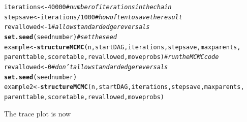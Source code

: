 \documentclass[a4paper]{article}\usepackage[]{graphicx}\usepackage[]{color}
\makeatletter
\newcommand{\hlnum}[1]{\textcolor[rgb]{0.686,0.059,0.569}{#1}}%
\newcommand{\hlcom}[1]{\textcolor[rgb]{0.678,0.584,0.686}{\textit{#1}}}%
\newcommand{\hlopt}[1]{\textcolor[rgb]{0,0,0}{#1}}%
\newcommand{\hlstd}[1]{\textcolor[rgb]{0.345,0.345,0.345}{#1}}%
\newcommand{\hlkwb}[1]{\textcolor[rgb]{0.69,0.353,0.396}{#1}}%
\newcommand{\hlkwd}[1]{\textcolor[rgb]{0.737,0.353,0.396}{\textbf{#1}}}%
\newenvironment{kframe}{%
 \def\at@end@of@kframe{}%
 \ifinner\ifhmode%
  \def\at@end@of@kframe{\end{minipage}}%
  \begin{minipage}{\columnwidth}%
 \fi\fi%
 \def\FrameCommand##1{\hskip\@totalleftmargin \hskip-\fboxsep
 \colorbox{shadecolor}{##1}\hskip-\fboxsep
     \hskip-\linewidth \hskip-\@totalleftmargin \hskip\columnwidth}%
 \MakeFramed {\advance\hsize-\width
   \@totalleftmargin\z@ \linewidth\hsize
   \@setminipage}}%
 {\par\unskip\endMakeFramed%
 \at@end@of@kframe}
\newenvironment{knitrout}{}{} %
\newcommand{\nn}{\noindent}
\makeatother
\begin{document}
\begin{knitrout}
\color{fgcolor}\begin{kframe}
\begin{alltt}
\hlstd{iterations} \hlkwb{<-} \hlnum{40000}  \hlcom{#number of iterations in the chain}
\hlstd{stepsave} \hlkwb{<-} \hlstd{iterations}\hlopt{/}\hlnum{1000}  \hlcom{#how often to save the result}
\hlstd{revallowed} \hlkwb{<-} \hlnum{1}  \hlcom{# allow standard edge reversals}
\hlkwd{set.seed}\hlstd{(seednumber)}  \hlcom{# set the seed}
\hlstd{example} \hlkwb{<-} \hlkwd{structureMCMC}\hlstd{(n, startDAG, iterations, stepsave, maxparents,}
    \hlstd{parenttable, scoretable, revallowed, moveprobs)}  \hlcom{# run the MCMC code}
\hlstd{revallowed} \hlkwb{<-} \hlnum{0}  \hlcom{# don't allow standard edge reversals}
\hlkwd{set.seed}\hlstd{(seednumber)}
\hlstd{example2} \hlkwb{<-} \hlkwd{structureMCMC}\hlstd{(n, startDAG, iterations, stepsave, maxparents,}
    \hlstd{parenttable, scoretable, revallowed, moveprobs)}
\end{alltt}
\end{kframe}
\end{knitrout}

\nn The trace plot is now
\end{document}
